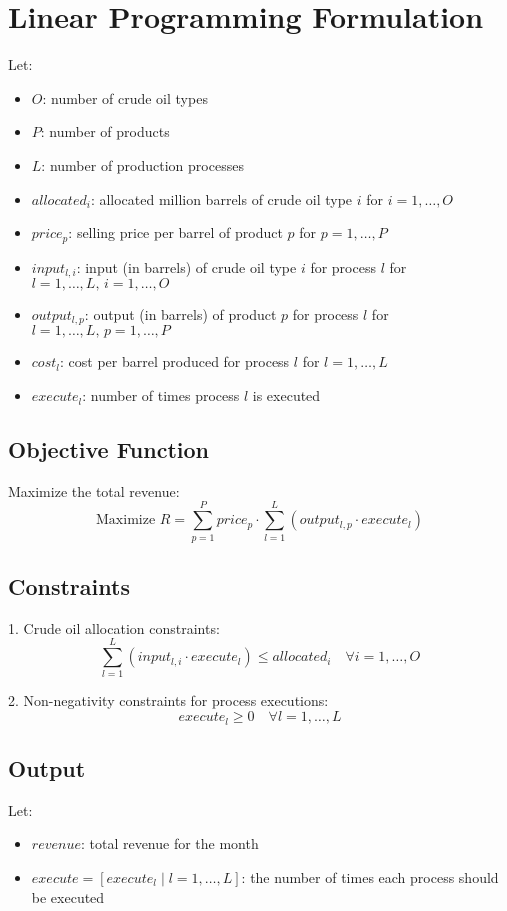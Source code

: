 \documentclass{article}
\begin{document}
\section*{Linear Programming Formulation}

Let:
\begin{itemize}
    \item $O$: number of crude oil types
    \item $P$: number of products
    \item $L$: number of production processes
    \item $allocated_i$: allocated million barrels of crude oil type $i$ for $i = 1, \ldots, O$
    \item $price_p$: selling price per barrel of product $p$ for $p = 1, \ldots, P$
    \item $input_{l,i}$: input (in barrels) of crude oil type $i$ for process $l$ for $l = 1, \ldots, L, \, i = 1, \ldots, O$
    \item $output_{l,p}$: output (in barrels) of product $p$ for process $l$ for $l = 1, \ldots, L, \, p = 1, \ldots, P$
    \item $cost_l$: cost per barrel produced for process $l$ for $l = 1, \ldots, L$
    \item $execute_l$: number of times process $l$ is executed
\end{itemize}

\subsection*{Objective Function}
Maximize the total revenue:
\[
\text{Maximize } R = \sum_{p=1}^{P} price_p \cdot \sum_{l=1}^{L} (output_{l,p} \cdot execute_l)
\]

\subsection*{Constraints}

1. Crude oil allocation constraints:
\[
\sum_{l=1}^{L} (input_{l,i} \cdot execute_l) \leq allocated_i \quad \forall i = 1, \ldots, O
\]

2. Non-negativity constraints for process executions:
\[
execute_l \geq 0 \quad \forall l = 1, \ldots, L
\]

\subsection*{Output}
Let:
\begin{itemize}
    \item $revenue$: total revenue for the month
    \item $execute = [execute_l \;|\; l = 1, \ldots, L]$: the number of times each process should be executed
\end{itemize}
\end{document}
